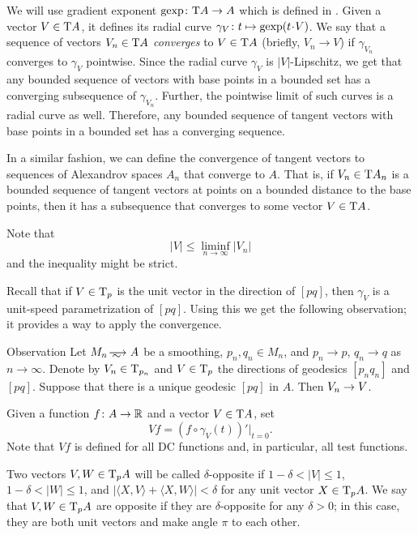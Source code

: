 We will use gradient exponent $\mathop{\rm gexp}\colon \mathrm{T} A\to A$ which is defined in \cite{AKP}.
Given a vector $V\in \mathrm{T} A$, it defines its radial curve $\gamma_{V}\:t\zz\mapsto \gexp (t\cdot V)$.
We say that a sequence of vectors $V_n\in \mathrm{T} A$ \emph{converges} to $V\in \mathrm{T} A$ (briefly, $V_n\to V$) if $\gamma_{V_n}$ converges to $\gamma_V$ pointwise.
Since the radial curve $\gamma_V$ is $|V|$-Lipschitz, we get that any bounded sequence of vectors with base points in a bounded set has a converging subsequence of $\gamma_{V_n}$.
Further, the pointwise limit of such curves is a radial curve as well.
Therefore, any bounded sequence of tangent vectors with base points in a bounded set has a converging sequence.

In a similar fashion, we can define the convergence of tangent vectors to sequences of Alexandrov spaces $A_n$ that converge to $A$.
That is, if $V_n\in \mathrm{T} A_n$ is a bounded sequence of tangent vectors at points on a bounded distance to the base points, then it has a subsequence that converges to some vector $V\in \mathrm{T} A$.

Note that 
\[|V|\le \liminf_{n\to\infty} |V_n|\]
and the inequality might be strict.

Recall that if $V\in \mathrm{T}_p$ is the unit vector in the direction of $[pq]$, then $\gamma_V$ is a unit-speed parametrization of $[pq]$.
Using this we get the following observation;
it provides a way to apply the convergence.

\begin{thm}{Observation}\label{obs:unique-geod}
Let $M_n\smooths{} A$ be a smoothing, $p_n,q_n\in M_n$, and $p_n\to p$, $q_n\to q$ as $n\to \infty$.
Denote by $V_n\in \mathrm{T}_{p_n}$ and $V\in \mathrm{T}_p$ the directions of geodesics $[p_nq_n]$ and $[pq]$.
Suppose that there is a unique geodesic $[pq]$ in $A$.
Then $V_n\zz\to V$.
\end{thm}



Given a function $f\colon A\to \mathbb{R}$ and a vector $V\in \mathrm{T} A$, set
\[Vf=(f\circ\gamma_V(t))'|_{t=0}.\]
Note that $Vf$ is defined for all DC functions and, in particular, all test functions.

Two vectors $V,W\in \mathrm{T}_pA$ will be called $\delta$-opposite if
$1-\delta< |V|\le 1$,
$1-\delta< |W|\le 1$,
and $|\langle X,V\rangle +\langle X,W\rangle|<\delta$ for any unit vector $X\in \mathrm{T}_p A$.
We say that $V,W\in \mathrm{T}_pA$ are opposite if they are $\delta$-opposite for any $\delta>0$;
in this case, they are both unit vectors and make angle $\pi$ to each other.

